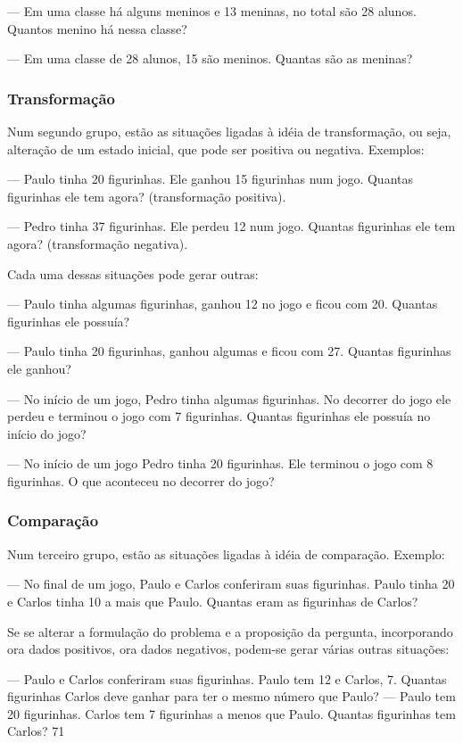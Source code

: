 — Em uma classe há alguns meninos e 13 meninas, no total são 28 alunos. Quantos menino há nessa classe?

— Em uma classe de 28 alunos, 15 são meninos. Quantas são as meninas?

\subsubsection{Transformação}

Num segundo grupo, estão as situações ligadas à idéia de transformação, ou seja, alteração de um estado inicial, que pode ser positiva ou negativa. Exemplos:

— Paulo tinha 20 figurinhas. Ele ganhou 15 figurinhas num jogo. Quantas figurinhas ele tem agora? (transformação positiva).

— Pedro tinha 37 figurinhas. Ele perdeu 12 num jogo. Quantas figurinhas ele tem agora? (transformação negativa).

Cada uma dessas situações pode gerar outras:

— Paulo tinha algumas figurinhas, ganhou 12 no jogo e ficou com 20. Quantas figurinhas ele possuía?

— Paulo tinha 20 figurinhas, ganhou algumas e ficou com 27. Quantas figurinhas ele ganhou?

— No início de um jogo, Pedro tinha algumas figurinhas. No decorrer do jogo ele perdeu e terminou o jogo com 7 figurinhas. Quantas figurinhas ele possuía no início do jogo?

— No início de um jogo Pedro tinha 20 figurinhas. Ele terminou o jogo com 8 figurinhas. O que aconteceu no decorrer do jogo?

\subsubsection{Comparação}
Num terceiro grupo, estão as situações ligadas à idéia de comparação.
Exemplo:

— No final de um jogo, Paulo e Carlos conferiram suas figurinhas. Paulo tinha 20 e Carlos tinha 10 a mais que Paulo. Quantas eram as figurinhas de Carlos?

Se se alterar a formulação do problema e a proposição da pergunta, incorporando ora dados positivos, ora dados negativos, podem-se gerar várias outras situações:

— Paulo e Carlos conferiram suas figurinhas. Paulo tem 12 e Carlos, 7. Quantas figurinhas Carlos deve ganhar para ter o mesmo número que Paulo?
— Paulo tem 20 figurinhas. Carlos tem 7 figurinhas a menos que Paulo. Quantas figurinhas tem Carlos? 71

